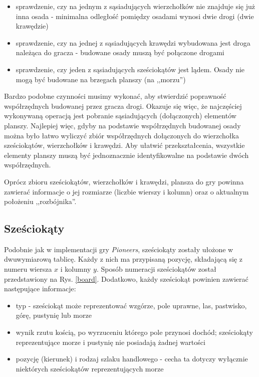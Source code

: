 \documentclass[11pt,twoside]{report}
\providecommand{\imref}[1]{Rys. \ref{#1}} %
\begin{document}
\begin{itemize}
\item sprawdzenie, czy na jednym z sąsiadujących wierzchołków nie
  znajduje się już inna osada - minimalna odległość pomiędzy osadami
  wynosi dwie drogi (dwie krawędzie)
\item sprawdzenie, czy na jednej z sąsiadujących krawędzi wybudowana
  jest droga należąca do gracza - budowane osady muszą być połączone
  drogami
\item sprawdzenie, czy jeden z sąsiadujących sześciokątów jest
  lądem. Osady nie mogą być budowane na brzegach planszy (na
  ,,morzu'')
\end{itemize}

Bardzo podobne czynności musimy wykonać, aby stwierdzić poprawność
współrzędnych budowanej przez gracza drogi. Okazuje się więc, że
najczęściej wykonywaną operacją jest pobranie sąsiadujących
(dołączonych) elementów planszy. Najlepiej więc, gdyby na podstawie
współrzędnych budowanej osady można było łatwo wyliczyć zbiór
współrzędnych dołączonych do wierzchołka sześciokątów, wierzchołków i
krawędzi. Aby ułatwić przekształcenia, wszystkie elementy planszy
muszą być jednoznacznie identyfikowalne na podstawie dwóch
współrzędnych.

Oprócz zbioru sześciokątów, wierzchołków i krawędzi, plansza do gry
powinna zawierać informacje o jej rozmiarze (liczbie wierszy i kolumn)
oraz o aktualnym położeniu ,,rozbójnika''.

\subsection{Sześciokąty}
Podobnie jak w implementacji gry \emph{Pioneers}, sześciokąty zostały
ułożone w dwuwymiarową tablicę. Każdy z nich ma przypisaną pozycję,
składającą się z numeru wiersza $x$ i kolumny $y$. Sposób numeracji
sześciokątów został przedstawiony na \imref{board}. Dodatkowo, każdy
sześciokąt powinien zawierać następujące informacje:

\begin{itemize}
\item typ - sześciokąt może reprezentować wzgórze, pole uprawne, las,
  pastwisko, górę, pustynię lub morze
\item wynik rzutu kością, po wyrzuceniu którego pole przynosi
  dochód; sześciokąty reprezentujące morze i pustynię nie posiadają
  żadnej wartości
\item pozycję (kierunek) i rodzaj szlaku handlowego - cecha ta dotyczy
  wyłącznie niektórych sześciokątów reprezentujących morze
\end{itemize}
\end{document}
